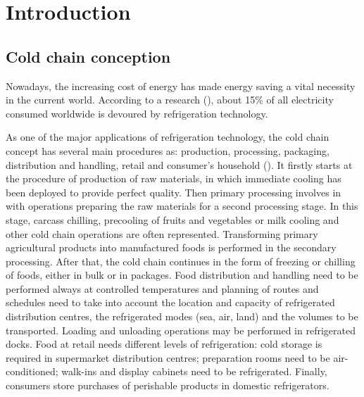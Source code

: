 \chapter*{Introduction}         %


\section{Cold chain conception}
Nowadays, the increasing cost of energy has made energy saving a vital necessity in the current world.
According to a research (\citet{coulomb2008refrigeration}), about 15\% of all electricity consumed worldwide is devoured by refrigeration technology. 

As one of the major applications of refrigeration technology, the cold chain concept has several main procedures as: production, processing, packaging, distribution and handling, retail and consumer's household (\citet{Estrada-Flores2010}). It firstly starts at the procedure of production of raw materials, in which immediate cooling has been deployed to provide perfect quality. Then primary processing involves in with operations preparing the raw materials for a second processing stage.  In this stage, carcass chilling, precooling of fruits and vegetables or milk cooling and other cold chain operations are often represented. Transforming primary agricultural products into manufactured foods is performed in the secondary processing. After that, the cold chain continues in the form of freezing or chilling of foods, either in bulk or in packages. Food distribution and handling need to be performed always at controlled temperatures and planning of routes and schedules need to take into account the location and capacity of refrigerated distribution centres, the refrigerated modes (sea, air, land) and the volumes to be transported. Loading and unloading operations may be performed in refrigerated docks. Food at retail needs different levels of refrigeration: cold storage is required in supermarket distribution centres; preparation rooms  need to be air-conditioned; walk-ins and display cabinets need to be refrigerated. Finally, consumers store purchases of perishable products in domestic refrigerators.

